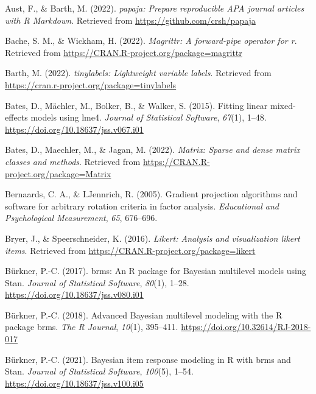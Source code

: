 \documentclass[
  english,
  man]{apa6}
\newlength{\cslhangindent}
\newlength{\cslentryspacingunit} %
\newenvironment{CSLReferences}[2] %
 {%
  \setlength{\parindent}{0pt}
  \ifodd #1
  \let\oldpar\par
  \def\par{\hangindent=\cslhangindent\oldpar}
  \fi
  \setlength{\parskip}{#2\cslentryspacingunit}
 }%
 {}
\begin{document}
\hypertarget{refs}{}
\begin{CSLReferences}{1}{0}
\leavevmode{}%
Aust, F., \& Barth, M. (2022). \emph{{papaja}: {Prepare} reproducible {APA} journal articles with {R Markdown}}. Retrieved from \url{https://github.com/crsh/papaja}

\leavevmode{}%
Bache, S. M., \& Wickham, H. (2022). \emph{Magrittr: A forward-pipe operator for r}. Retrieved from \url{https://CRAN.R-project.org/package=magrittr}

\leavevmode{}%
Barth, M. (2022). \emph{{tinylabels}: Lightweight variable labels}. Retrieved from \url{https://cran.r-project.org/package=tinylabels}

\leavevmode{}%
Bates, D., Mächler, M., Bolker, B., \& Walker, S. (2015). Fitting linear mixed-effects models using {lme4}. \emph{Journal of Statistical Software}, \emph{67}(1), 1--48. \url{https://doi.org/10.18637/jss.v067.i01}

\leavevmode{}%
Bates, D., Maechler, M., \& Jagan, M. (2022). \emph{Matrix: Sparse and dense matrix classes and methods}. Retrieved from \url{https://CRAN.R-project.org/package=Matrix}

\leavevmode{}%
Bernaards, C. A., \& I.Jennrich, R. (2005). Gradient projection algorithms and software for arbitrary rotation criteria in factor analysis. \emph{Educational and Psychological Measurement}, \emph{65}, 676--696.

\leavevmode{}%
Bryer, J., \& Speerschneider, K. (2016). \emph{Likert: Analysis and visualization likert items}. Retrieved from \url{https://CRAN.R-project.org/package=likert}

\leavevmode{}%
Bürkner, P.-C. (2017). {brms}: An {R} package for {Bayesian} multilevel models using {Stan}. \emph{Journal of Statistical Software}, \emph{80}(1), 1--28. \url{https://doi.org/10.18637/jss.v080.i01}

\leavevmode{}%
Bürkner, P.-C. (2018). Advanced {Bayesian} multilevel modeling with the {R} package {brms}. \emph{The R Journal}, \emph{10}(1), 395--411. \url{https://doi.org/10.32614/RJ-2018-017}

\leavevmode{}%
Bürkner, P.-C. (2021). Bayesian item response modeling in {R} with {brms} and {Stan}. \emph{Journal of Statistical Software}, \emph{100}(5), 1--54. \url{https://doi.org/10.18637/jss.v100.i05}


\end{CSLReferences}
\end{document}

